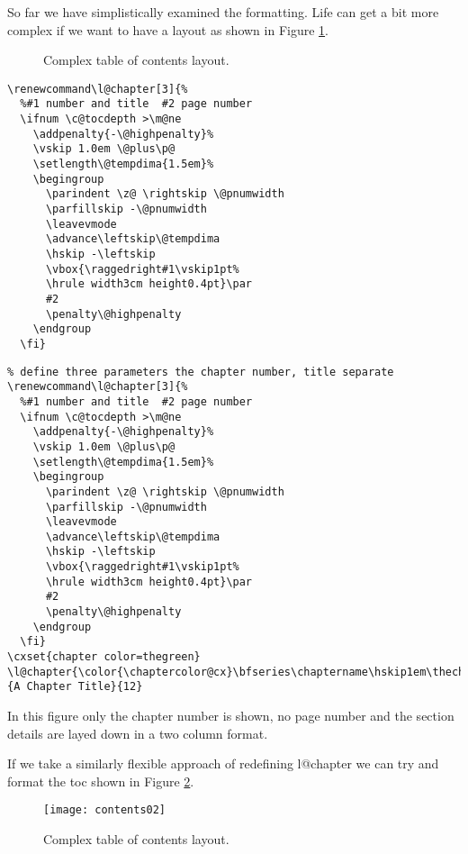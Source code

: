 So far we have simplistically examined the formatting. Life can get a bit more complex if we want to have a layout as shown in Figure \ref{fig:toc}.

\begin{figure}[tp]
\caption{Complex table of contents layout.}
\label{fig:toc}
\end{figure}


\begin{lstlisting}
\renewcommand\l@chapter[3]{%
  %#1 number and title  #2 page number
  \ifnum \c@tocdepth >\m@ne
    \addpenalty{-\@highpenalty}%
    \vskip 1.0em \@plus\p@
    \setlength\@tempdima{1.5em}%
    \begingroup
      \parindent \z@ \rightskip \@pnumwidth
      \parfillskip -\@pnumwidth
      \leavevmode
      \advance\leftskip\@tempdima
      \hskip -\leftskip
      \vbox{\raggedright#1\vskip1pt%
      \hrule width3cm height0.4pt}\par
      #2
      \penalty\@highpenalty
    \endgroup
  \fi}
\end{lstlisting}

\begin{lstlisting}
% define three parameters the chapter number, title separate
\renewcommand\l@chapter[3]{%
  %#1 number and title  #2 page number
  \ifnum \c@tocdepth >\m@ne
    \addpenalty{-\@highpenalty}%
    \vskip 1.0em \@plus\p@
    \setlength\@tempdima{1.5em}%
    \begingroup
      \parindent \z@ \rightskip \@pnumwidth
      \parfillskip -\@pnumwidth
      \leavevmode
      \advance\leftskip\@tempdima
      \hskip -\leftskip
      \vbox{\raggedright#1\vskip1pt%
      \hrule width3cm height0.4pt}\par
      #2
      \penalty\@highpenalty
    \endgroup
  \fi}
\cxset{chapter color=thegreen}
\l@chapter{\color{\chaptercolor@cx}\bfseries\chaptername\hskip1em\thechapter}{A Chapter Title}{12}
\end{lstlisting}


In this figure only the chapter number is shown, no page number and the section details are layed down in a two column format.


If we take a similarly flexible approach of redefining l@chapter we can try and format the toc shown in Figure \ref{fig:tocsteward}.

\begin{figure}[tp]
\texttt{[image: contents02]}
\caption{Complex table of contents layout.}
\label{fig:tocsteward}
\end{figure}



